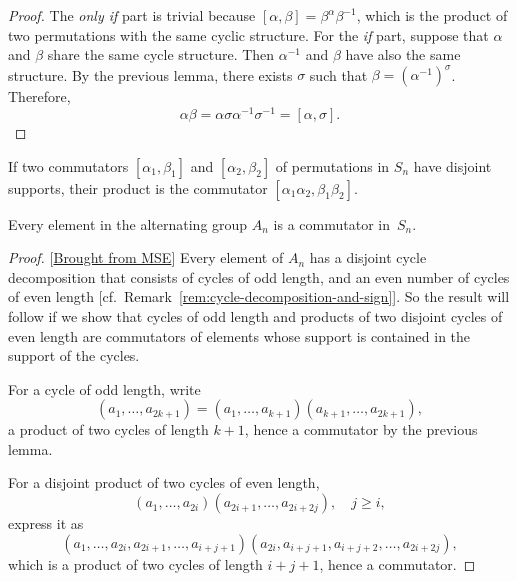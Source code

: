 \begin{proof} The \textit{only if\/} part is trivial because $[\alpha,\beta]=\beta^\alpha\beta^{-1}$, which is the product of two permutations with the same cyclic structure. For the \textit{if\/} part, suppose that $\alpha$ and $\beta$ share the same cycle structure. Then $\alpha^{-1}$ and $\beta$ have also the same structure. By the previous lemma, there exists $\sigma$ such that $\beta=(\alpha^{-1})^\sigma$. Therefore, 
$$
    \alpha\beta = \alpha\sigma\alpha^{-1}\sigma^{-1}=[\alpha,\sigma].
$$
\end{proof}

\begin{rem}
    If two commutators\/ $[\alpha_1,\beta_1]$ and\/ $[\alpha_2,\beta_2]$ of permutations in\/ $S_n$ have disjoint supports, their product is the commutator\/ $[\alpha_1\alpha_2,\beta_1\beta_2]$.
\end{rem}


\begin{thm}
    Every element in the alternating group\/ $A_n$ is a commutator in\/~$S_n$.
\end{thm}

\begin{proof} {[\href{https://math.stackexchange.com/a/4825323/269050}{Brought from MSE}]} Every element of $A_n$ has a disjoint cycle decomposition that consists of cycles of odd length, and an even number of cycles of even length [cf.~Remark~\ref{rem:cycle-decomposition-and-sign}]. So the result will follow if we show that cycles of odd length and products of two disjoint cycles of even length are commutators of elements whose support is contained in the support of the cycles.

For a cycle of odd length, write
$$
    (a_1,\dots,a_{2k+1}) = (a_1,\ldots,a_{k+1})(a_{k+1},\ldots,a_{2k+1}),
$$
a product of two cycles of length $k+1$, hence a commutator by the previous lemma.

For a disjoint product of two cycles of even length,
$$
    (a_1,\dots,a_{2i})(a_{2i+1},\dots,a_{2i+2j}),\quad j\ge i,
$$
express it as
$$
    (a_1,\dots,a_{2i},a_{2i+1},\dots,a_{i+j+1})(a_{2i},a_{i+j+1},a_{i+j+2},\dots,a_{2i+2j}),
$$
which is a product of two cycles of length $i+j+1$, hence a commutator.

\end{proof}

